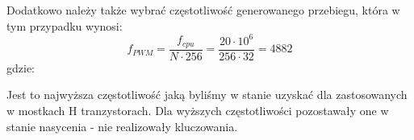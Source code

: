 \noindent
Dodatkowo należy także wybrać częstotliwość generowanego przebiegu, która w tym przypadku wynosi:
\begin{equation}
	f_{PWM} =  \frac{f_{cpu}}{N \cdot 256} = \frac{20 \cdot 10^6}{256 \cdot 32} = 4882 
   \label{eq:czest_kola}
 \end{equation}
 gdzie:  
 \begin{equationDescriptor}
 \end{equationDescriptor}
\noindent
Jest to najwyższa częstotliwość jaką byliśmy w stanie uzyskać dla zastosowanych w mostkach H tranzystorach. Dla wyższych częstotliwości pozostawały one w stanie nasycenia - nie realizowały kluczowania. 

